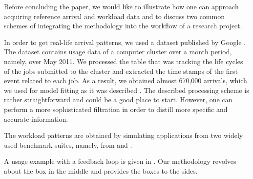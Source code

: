 

Before concluding the paper, we would like to illustrate how one can approach
acquiring reference arrival and workload data and to discuss two common schemes
of integrating the methodology into the workflow of a research project.

In order to get real-life arrival patterns, we used a dataset published by
Google \cite{google}. The dataset contains usage data of a computer cluster over
a month period, namely, over May 2011. We processed the table that was tracking
the life cycles of the jobs submitted to the cluster and extracted the time
stamps of the first event related to each job. As a result, we obtained almost
670,000 arrivals, which we used for model fitting as it was described
. The described processing scheme is rather straightforward and
could be a good place to start. However, one can perform a more sophisticated
filtration in order to distill more specific and accurate information.

The workload patterns are obtained by simulating applications from two widely
used benchmark suites, namely, from  \cite{bienia2011} and  \cite{cpu2006}.

A usage example with a feedback loop is given in . Our methodology
revolves about the box in the middle and provides the boxes to the sides.
